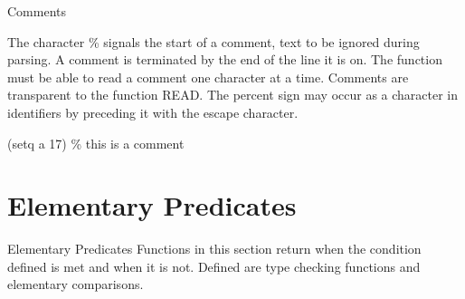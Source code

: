 \begin{Introduction}{Comments}

The character \% signals the start of a comment, text to be ignored during
parsing.  A comment is terminated by the end of the line it is on.  The
function must be able to read a comment one character at a
time.  Comments are transparent to the function READ.  The percent sign
may occur as a character in identifiers by preceding it with the escape
character.

   (setq a 17) \% this is a comment

\end{Introduction}

\section{Elementary Predicates}

\begin{Introduction}{Elementary Predicates}
Functions in this section return  when the condition defined is met
and  when it is not. Defined are type checking functions and
elementary comparisons.
\end{Introduction}

